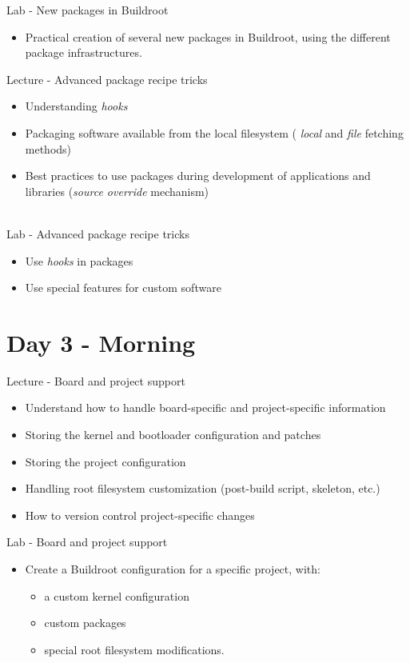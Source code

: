\documentclass[a4paper,12pt,obeyspaces,spaces,hyphens]{article}
\begin{document}
\feagendatwocolumn
{Lab - New packages in Buildroot}
{
  \begin{itemize}
  \item Practical creation of several new packages in Buildroot,
    using the different package infrastructures.
  \end{itemize}
}
{Lecture - Advanced package recipe tricks}
{
  \begin{itemize}
  \item Understanding {\em hooks}
  \item Packaging software available from the local filesystem ({\em
      local} and {\em file} fetching methods)
  \item Best practices to use packages during development of
    applications and libraries ({\em source override} mechanism)
  \end{itemize}
}
\\
\feagendaonecolumn
{Lab - Advanced package recipe tricks}
{
  \begin{itemize}
  \item Use {\em hooks} in packages
  \item Use special features for custom software
  \end{itemize}
}

\section{Day 3 - Morning}

\feagendatwocolumn
{Lecture - Board and project support}
{
  \begin{itemize}
  \item Understand how to handle board-specific and project-specific
    information
  \item Storing the kernel and bootloader configuration and patches
  \item Storing the project configuration
  \item Handling root filesystem customization (post-build script,
    skeleton, etc.)
  \item How to version control project-specific changes
  \end{itemize}
}
{Lab - Board and project support}
{
  \begin{itemize}
  \item Create a Buildroot configuration for a specific project, with:
    \begin{itemize}
    \item a custom kernel configuration
    \item custom packages
    \item special root filesystem modifications.
    \end{itemize}
  \end{itemize}
}
\end{document}
